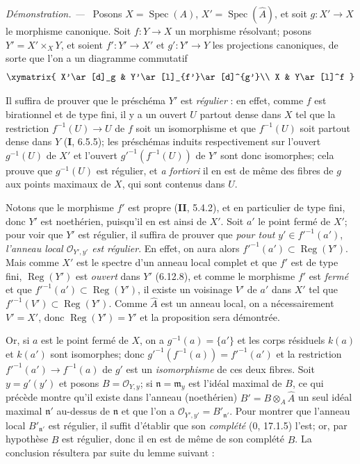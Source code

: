 \documentclass[10pt,oneside]{book}
\newcommand{\oldpage}[2][]{%
  \setcounter{footnote}{0}%
  \marginpar{\scriptsize\textbf{#1}~|~#2}\ignorespaces}
\newenvironment{proof}{%
  \par\medskip\noindent\textit{Démonstration. ---\ }}{\par}
\begin{document}
\begin{proof}
Posons $X=\operatorname{Spec}(A)$, $X'=\operatorname{Spec}(\widehat A)$, et
soit $g:X'\to X$ le morphisme canonique. Soit $f:Y\to X$ un morphisme
résolvant; posons $Y'=X'\times_XY$, et soient $f':Y'\to X'$ et $g':Y'\to Y$
les projections canoniques, de sorte que l'on a un diagramme commutatif
\[
\xymatrix{
X'\ar[d]_g & Y'\ar[l]_{f'}\ar[d]^{g'}\\
X & Y\ar[l]^f
}
\]

Il suffira de prouver que le préschéma $Y'$ est \emph{régulier} : en effet,
comme $f$ est birationnel et de type fini, il y a un ouvert $U$ partout dense
dans $X$ tel que la restriction $f^{-1}(U)\to U$ de $f$ soit un isomorphisme
et que $f^{-1}(U)$ soit partout dense dans $Y$ (\textbf{I}, 6.5.5); les
préschémas induits respectivement sur l'ouvert $g^{-1}(U)$ de $X'$ et l'ouvert
$g'^{-1}(f^{-1}(U))$ de $Y'$ sont donc isomorphes; cela prouve que
$g^{-1}(U)$ est régulier, et \emph{a fortiori} il en est de même des fibres de
$g$ aux points maximaux de $X$, qui sont contenus dans $U$.

\oldpage[IV-2]{219}

Notons que le morphisme $f'$ est propre (\textbf{II}, 5.4.2), et en
particulier de type fini, donc $Y'$ est noethérien, puisqu'il en est ainsi de
$X'$. Soit $a'$ le point fermé de $X'$; pour voir que $Y'$ est régulier, il
suffira de prouver que \emph{pour tout} $y'\in f'^{-1}(a')$, \emph{l'anneau
local $\mathcal O_{Y',y'}$ est régulier}. En effet, on aura alors
$f'^{-1}(a')\subset\operatorname{Reg}(Y')$. Mais comme $X'$ est le spectre
d'un anneau local complet et que $f'$ est de type fini,
$\operatorname{Reg}(Y')$ est \emph{ouvert} dans $Y'$ (6.12.8), et comme le
morphisme $f'$ est \emph{fermé} et que
$f'^{-1}(a')\subset\operatorname{Reg}(Y')$, il existe un voisinage $V'$ de
$a'$ dans $X'$ tel que $f'^{-1}(V')\subset\operatorname{Reg}(Y')$. Comme
$\widehat A$ est un anneau local, on a nécessairement $V'=X'$, donc
$\operatorname{Reg}(Y')=Y'$ et la proposition sera démontrée.

Or, si $a$ est le point fermé de $X$, on a $g^{-1}(a)=\{a'\}$ et les corps
résiduels $k(a)$ et $k(a')$ sont isomorphes; donc
$g'^{-1}(f^{-1}(a))=f'^{-1}(a')$ et la restriction
$f'^{-1}(a')\to f^{-1}(a)$ de $g'$ est un \emph{isomorphisme} de ces deux
fibres. Soit $y=g'(y')$ et posons $B=\mathcal O_{Y,y}$; si
$\mathfrak n=\mathfrak m_y$ est l'idéal maximal de $B$, ce qui précède montre
qu'il existe dans l'anneau (noethérien) $B'=B\otimes_A\widehat A$ un seul
idéal maximal $\mathfrak n'$ au-dessus de $\mathfrak n$ et que l'on a
$\mathcal O_{Y',y'}=B'_{\mathfrak n'}$. Pour montrer que l'anneau local
$B'_{\mathfrak n'}$ est régulier, il suffit d'établir que son \emph{complété}
(0, 17.1.5) l'est; or, par hypothèse $B$ est régulier, donc il en est de même
de son complété $\widehat B$. La conclusion résultera par suite du lemme
suivant :


\end{proof}
\end{document}
